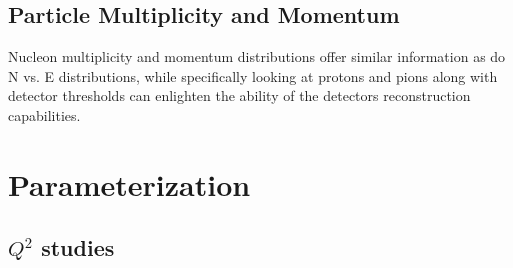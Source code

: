 \documentclass[12pt]{article}
\begin{document}
\subsection{Particle Multiplicity and Momentum}

Nucleon multiplicity and momentum distributions offer similar information as do N vs. E distributions, while specifically looking at protons and pions along with detector thresholds can enlighten the ability of the detectors reconstruction capabilities. 

\section{Parameterization}
\subsection{$Q^2$ studies}
\end{document}
